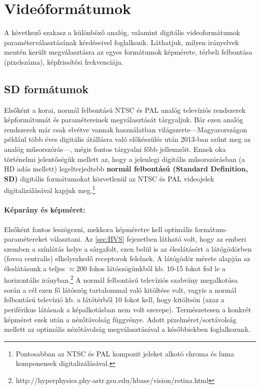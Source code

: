 \section{Videóformátumok}

A következő szakasz a különböző analóg, valamint digitális videoformátumok paraméterválasztásának kérdéseivel foglalkozik.
Láthatjuk, milyen irányelvek mentén került megválasztásra az egyes formátumok képmérete, térbeli felbontása (pixelszáma), képfrissítési frekvenciája. 

\subsection{SD formátumok}

Elsőként a korai, normál felbontású NTSC és PAL analóg televíziós rendszerek képformátumát és paramétereinek megválasztását tárgyaljuk.
Bár ezen analóg rendszerek már csak elvétve vannak használatban világszerte---Magyarországon például több éves digitális átállásra való előkészülés után 2013-ban szűnt meg az analóg műsorszórás---, mégis fontos tárgyalni főbb jellemzőit.
Ennek oka történelmi jelentőségük mellett az, hogy a jelenlegi digitális műsorszórásban (a HD adás mellett) legelterjedtebb \textbf{normál felbontású (Standard Definition, SD)} digitális formátumokat közvetlenül az NTSC és PAL videojelek digitalizálásával kapjuk meg.\footnote{Pontosabban az NTSC és PAL kompozit jeleket alkotó chroma és luma komponensek digitalizálásával.}

\paragraph{Képarány és képméret:\\}
Elsőként fontos leszögezni, mekkora képméretre kell optimális formátum-paramétereket választani.
Az \ref{sec:HVS} fejezetben látható volt, hogy az emberi szemben a színlátás helye a sárgafolt, ezen belül is az éleslátásért a látógödörben (fovea centralis) elhelyezkedő receptorok felelnek.
A látógödör mérete alapján az éleslátásunk a teljes $\approx200$ fokos látószögünkből kb. 10-15 fokot fed le a horizontális irányban.\footnote{http://hyperphysics.phy-astr.gsu.edu/hbase/vision/retina.html}
A normál felbontású televíziós szabvány megalkotása során a cél ezen fő látószög tartalommal való kitöltése volt, vagyis a normál felbontású televízió kb. a látótérből 10 fokot kell, hogy kitöltsön (azaz a periférikus látásnak a képalkotásban nem volt szerepe).
Természetesen a konkrét képméret ezek után a nézőtávolság függvénye.
Adott pixelméret/sortávolság mellett az optimális nézőtávolság megválasztásával a későbbiekben foglalkozunk.

